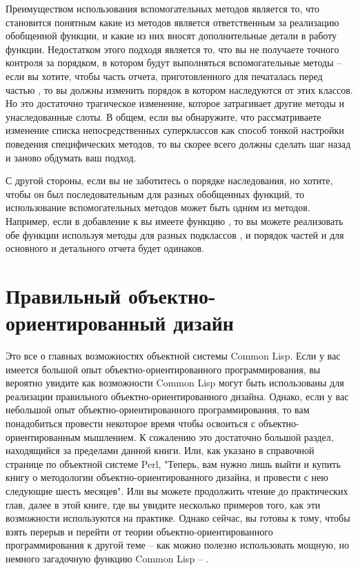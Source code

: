 Преимуществом использования вспомогательных методов является то, что становится понятным
какие из методов является ответственным за реализацию обобщенной функции, и какие из них
вносят дополнительные детали в работу функции.  Недостатком этого подходя является то, что
вы не получаете точного контроля за порядком, в котором будут выполняться вспомогательные
методы -- если вы хотите, чтобы часть отчета, приготовленного для 
печаталась перед частью , то вы должны изменить порядок в котором
 наследуются от этих классов.  Но это достаточно трагическое
изменение, которое затрагивает другие методы и унаследованные слоты.  В общем, если вы
обнаружите, что рассматриваете изменение списка непосредственных суперклассов как способ
тонкой настройки поведения специфических методов, то вы скорее всего должны сделать шаг
назад и заново обдумать ваш подход.

С другой стороны, если вы не заботитесь о порядке наследования, но хотите, чтобы он был
последовательным для разных обобщенных функций, то использование вспомогательных методов
может быть одним из методов.  Например, если в добавление к  вы
имеете функцию , то вы можете реализовать обе функции
используя методы для разных подклассов , и порядок частей
и для основного и детального отчета будет одинаков.


\section{Правильный объектно-ориентированный дизайн}

Это все о главных возможностях объектной системы Common Lisp.  Если у вас имеется большой
опыт объектно-ориентированного программирования, вы вероятно увидите как возможности
Common Lisp могут быть использованы для реализации правильного объектно-ориентированного
дизайна.  Однако, если у вас небольшой опыт объектно-ориентированного программирования, то
вам понадобиться провести некоторое время чтобы освоиться с объектно-ориентированным
мышлением.  К сожалению это достаточно большой раздел, находящийся за пределами данной
книги.  Или, как указано в справочной странице по объектной системе Perl, "Теперь, вам
нужно лишь выйти и купить книгу о методологии объектно-ориентированного дизайна, и
провести с нею следующие шесть месяцев".  Или вы можете продолжить чтение до практических
глав, далее в этой книге, где вы увидите несколько примеров того, как эти возможности
используются на практике.  Однако сейчас, вы готовы к тому, чтобы взять перерыв и перейти
от теории объектно-ориентированного программирования к другой теме -- как можно полезно
использовать мощную, но немного загадочную функцию Common Lisp -- .


